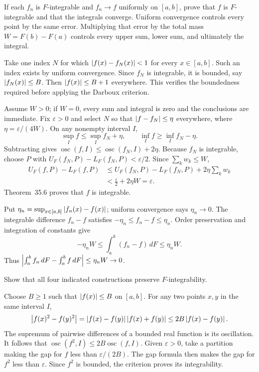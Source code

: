 \goal If each $f_n$ is $F$-integrable and $f_n\to f$ uniformly on
$[a,b]$, prove that $f$ is $F$-integrable and that the integrals converge.
\idea Uniform convergence controls every point by the same error.
Multiplying that error by the total mass $W=F(b)-F(a)$ controls
every upper sum, lower sum, and ultimately the integral.

Take one index $N$ for which $\left|f(x)-f_N(x)\right|<1$ for every
$x\in[a,b]$. Such an index exists by uniform convergence. Since
$f_N$ is integrable, it is bounded, say $\left|f_N(x)\right|\le B$.
Then $\left|f(x)\right|\le B+1$ everywhere. This verifies the boundedness
required before applying the Darboux criterion.

Assume $W>0$; if $W=0$, every sum and integral is zero and the
conclusions are immediate. Fix $\varepsilon>0$ and select $N$ so
that $\left|f-f_N\right|\le\eta$ everywhere, where
$\eta=\varepsilon/(4W)$. On any nonempty interval $I$,
\[
 \sup_I f\le\sup_I f_N+\eta,\qquad
 \inf_I f\ge\inf_I f_N-\eta.
\]
Subtracting gives
$\operatorname{osc}(f,I)\le\operatorname{osc}(f_N,I)+2\eta$.
Because $f_N$ is integrable, choose $P$ with
$U_F(f_N,P)-L_F(f_N,P)<\varepsilon/2$. Since $\sum_kw_k\le W$,
\begin{align*}
 U_F(f,P)-L_F(f,P)
 &\le U_F(f_N,P)-L_F(f_N,P)+2\eta\sum_kw_k\\
 &<\frac\varepsilon2+2\eta W=\varepsilon.
\end{align*}
Theorem~35.6 proves that $f$ is integrable.

Put $\eta_n=\sup_{x\in[a,b]}\left|f_n(x)-f(x)\right|$; uniform
convergence says $\eta_n\to0$. The integrable difference
$f_n-f$ satisfies $-\eta_n\le f_n-f\le\eta_n$. Order preservation
and integration of constants give
\[
 -\eta_nW\le\int_a^b(f_n-f)\,dF\le\eta_nW.
\]
Thus $\left|\int_a^bf_n\,dF-\int_a^bf\,dF\right|\le\eta_nW\to0$.

\goal Show that all four indicated constructions preserve $F$-integrability.

Choose $B\ge1$ such that $\left|f(x)\right|\le B$ on $[a,b]$.
For any two points $x,y$ in the same interval $I$,
\[
 \left|f(x)^2-f(y)^2\right|
 =\left|f(x)-f(y)\right|\left|f(x)+f(y)\right|
 \le2B\left|f(x)-f(y)\right|.
\]
The supremum of pairwise differences of a bounded real function
is its oscillation. It follows that
$\operatorname{osc}(f^2,I)\le2B\operatorname{osc}(f,I)$.
Given $\varepsilon>0$, take a partition making the gap for $f$
less than $\varepsilon/(2B)$. The gap formula then makes the gap
for $f^2$ less than $\varepsilon$. Since $f^2$ is bounded, the
criterion proves its integrability.

